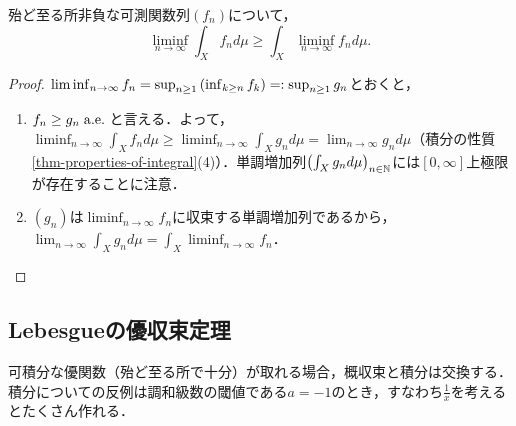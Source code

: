 \documentclass[uplatex, dvipdfmx]{jsreport}
\begin{document}
\begin{theorem}
    殆ど至る所非負な可測関数列$(f_n)$について，
    \[\liminf_{n\to\infty}\int_Xf_nd\mu\ge\int_X\liminf_{n\to\infty}f_nd\mu.\]
\end{theorem}
\begin{proof}
    $\liminf_{n\to\infty}f_n=\sup_{n\ge 1}\left(\inf_{k\ge n}f_k\right)=:\sup_{n\ge 1}g_n$とおくと，
    \begin{enumerate}
        \item $f_n\ge g_n\;\mathrm{a.e.}\;$と言える．よって，$\liminf_{n\to\infty}\int_Xf_nd\mu\ge\liminf_{n\to\infty}\int_Xg_nd\mu=\lim_{n\to\infty}g_nd\mu$（積分の性質\ref{thm-properties-of-integral}(4)）．単調増加列$\left(\int_Xg_nd\mu\right)_{n\in\mathbb{N}}$には$[0,\infty]$上極限が存在することに注意．
        \item  $(g_n)$は$\liminf_{n\to\infty}f_n$に収束する単調増加列であるから，$\lim_{n\to\infty}\int_Xg_nd\mu=\int_X\liminf_{n\to\infty}f_n$．
    \end{enumerate}
\end{proof}

\subsection{Lebesgueの優収束定理}

\begin{tcolorbox}[colframe=ForestGreen, colback=ForestGreen!10!white,breakable,colbacktitle=ForestGreen!40!white,coltitle=black,fonttitle=\bfseries\sffamily,
title=]
    可積分な優関数（殆ど至る所で十分）が取れる場合，概収束と積分は交換する．
    積分についての反例は調和級数の閾値である$a=-1$のとき，すなわち$\frac{1}{x}$を考えるとたくさん作れる．
\end{tcolorbox}
\end{document}

